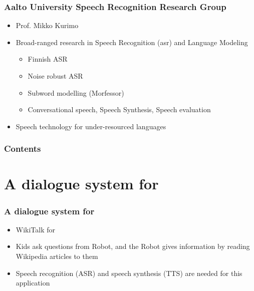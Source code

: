 %
\begin{frame}
\frametitle{Aalto University Speech Recognition Research Group}
\begin{itemize}
\item Prof. Mikko Kurimo
\item Broad-ranged research in Speech Recognition (asr) and Language Modeling
\begin{itemize}
\item Finnish ASR
\item Noise robust ASR
\item Subword modelling (Morfessor)
\item Conversational speech, Speech Synthesis, Speech evaluation
\end{itemize}

\item Speech technology for under-resourced languages
\end{itemize}
\end{frame}


\begin{frame}
\frametitle{Contents}
\tableofcontents
\end{frame}





\section{A dialogue system for \ns}
\begin{frame}
\frametitle{A dialogue system for \ns}
\begin{itemize}
\item WikiTalk for \ns
\item Kids ask questions from Robot, and the Robot gives information by reading Wikipedia articles to them
\item Speech recognition (ASR) and speech synthesis (TTS) are needed for this application
\end{itemize}
\end{frame}

